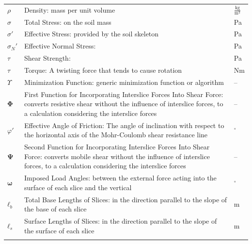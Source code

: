 \documentclass[12pt]{article}
\begin{document}
\begin{longtabu}{l X[l] l}
\\
$ρ$ & Density: mass per unit volume & $\frac{\text{kg}}{\text{m}^{3}}$
\\
$σ$ & Total Stress: on the soil mass & Pa
\\
$σ'$ & Effective Stress: provided by the soil skeleton & Pa
\\
${σ_{N}}'$ & Effective Normal Stress:  & Pa
\\
$τ$ & Shear Strength:  & Pa
\\
$τ$ & Torque: A twisting force that tends to cause rotation & Nm
\\
$Υ$ & Minimization Function: generic minimization function or algorithm & --
\\
$\mathbf{Φ}$ & First Function for Incorporating Interslice Forces Into Shear Force: converts resistive shear without the influence of interslice forces, to a calculation considering the interslice forces & --
\\
$φ'$ & Effective Angle of Friction: The angle of inclination with respect to the horizontal axis of the Mohr-Coulomb shear resistance line & ${}^{\circ}$
\\
$\mathbf{Ψ}$ & Second Function for Incorporating Interslice Forces Into Shear Force: converts mobile shear without the influence of interslice forces, to a calculation considering the interslice forces & --
\\
$\mathbf{ω}$ & Imposed Load Angles: between the external force acting into the surface of each slice and the vertical & ${}^{\circ}$
\\
${\mathbf{ℓ}_{b}}$ & Total Base Lengths of Slices: in the direction parallel to the slope of the base of each slice & m
\\
${\mathbf{ℓ}_{s}}$ & Surface Lengths of Slices: in the direction parallel to the slope of the surface of each slice & m
\\
\bottomrule
\caption{}
\label{Table:ToS}
\end{longtabu}
\end{document}
